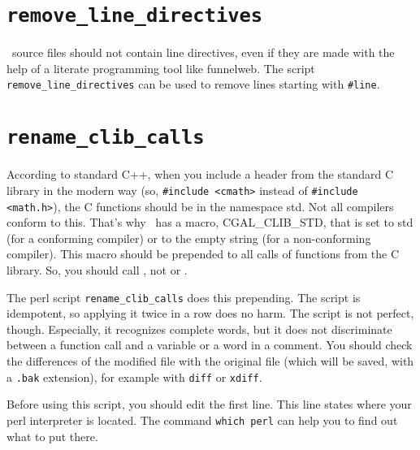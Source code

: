 \section{{\tt remove\_line\_directives}}
\label{sec:remove_line_directives}

\cgal\ source files should not contain line directives, even if they are made
with the help of a literate programming tool like funnelweb.
The script
{{\tt remove\_line\_directives}} can be used to remove
lines starting with {\tt \#line}.

\section{{\tt rename\_clib\_calls}}
\label{sec:rename_clib_calls}

According to standard C++, when you include a header from the standard C
library in the modern way (so, \verb+#include <cmath>+ instead of
\verb+#include <math.h>+), the C functions should be in the namespace
{\ccFont std}.
Not all compilers conform to this.
That's why \cgal\ has a macro, CGAL\_CLIB\_STD,%
that is set to {\ccFont std} (for
a conforming compiler) or to the empty string (for a non-conforming
compiler). This macro should be prepended to all calls of functions from
the C library. So, you should call , not
 or .

The perl script
{{\tt rename\_clib\_calls}}
does this prepending.
The script is idempotent, so applying it twice in a row does no harm.
The script is not perfect, though. Especially, it recognizes complete
words, but it does not discriminate between a function call and a variable
or a word in a comment.
You should check the differences of the modified file with the original
file (which will be saved, with a {\tt .bak} extension), for example with
{\tt diff} or {\tt xdiff}.

Before using this script, you should edit the first line. This line
states where your perl interpreter is located. The command {\tt which perl}
can help you to find out what to put there.

